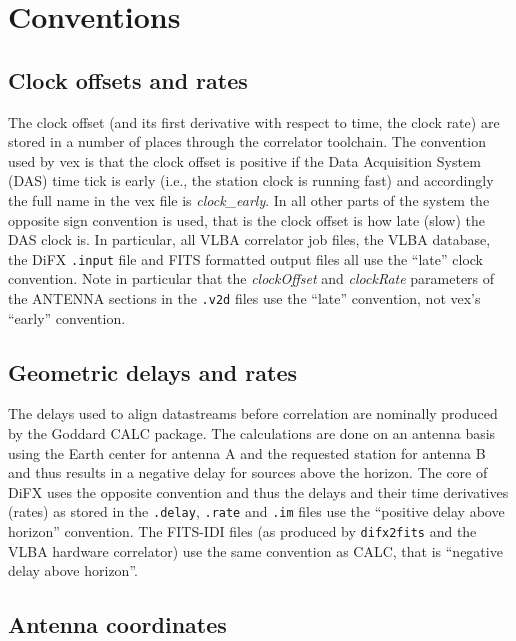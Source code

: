 \section{Conventions} \label{sec:conventions}

\subsection{Clock offsets and rates} \label{sec:clockconventions}

The clock offset (and its first derivative with respect to time, the clock rate) are stored in a number of places through the correlator toolchain.
The convention used by vex is that the clock offset is positive if the Data Acquisition System (DAS) time tick is early (i.e., the station clock is running fast) and accordingly the full name in the vex file is {\em clock\_early}.
In all other parts of the system the opposite sign convention is used, that is the clock offset is how late (slow) the DAS clock is.
In particular, all VLBA correlator job files, the VLBA database, the DiFX {\tt .input} file and FITS formatted output files all use the ``late'' clock convention.
Note in particular that the {\em clockOffset} and {\em clockRate} parameters of the ANTENNA sections in the {\tt .v2d} files use the ``late'' convention, not vex's ``early'' convention. 

\subsection{Geometric delays and rates} \label{delayconventions}

The delays used to align datastreams before correlation are nominally produced by the Goddard CALC package.
The calculations are done on an antenna basis using the Earth center for antenna A and the requested station for antenna B and thus results in a negative delay for sources above the horizon.
The core of DiFX uses the opposite convention and thus the delays and their time derivatives (rates) as stored in the {\tt .delay}, {\tt .rate} and {\tt .im} files use the ``positive delay above horizon'' convention.
The FITS-IDI files (as produced by {\tt difx2fits} and the VLBA hardware correlator) use the same convention as CALC, that is ``negative delay above horizon''.

\subsection{Antenna coordinates} \label{sec:antennacoordconventions}

